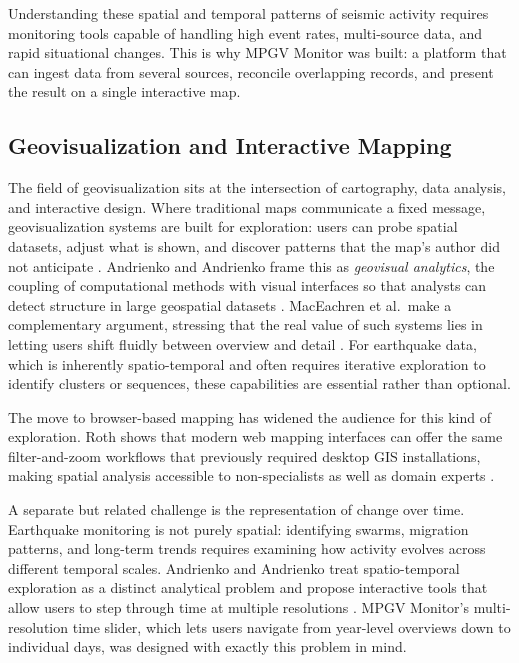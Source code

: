 \documentclass[12pt]{article}
\begin{document}
Understanding these spatial and temporal patterns of seismic activity requires monitoring tools capable of handling high event rates, multi-source data, and rapid situational changes. This is why MPGV Monitor was built: a platform that can ingest data from several sources, reconcile overlapping records, and present the result on a single interactive map.

\subsection{Geovisualization and Interactive Mapping}

The field of geovisualization sits at the intersection of cartography, data analysis, and interactive design. Where traditional maps communicate a fixed message, geovisualization systems are built for exploration: users can probe spatial datasets, adjust what is shown, and discover patterns that the map's author did not anticipate \cite{Andrienko2007Geovisual, MacEachren2004Geovisualization}. Andrienko and Andrienko frame this as \emph{geovisual analytics}, the coupling of computational methods with visual interfaces so that analysts can detect structure in large geospatial datasets \cite{Andrienko2007Geovisual}. MacEachren et al.\ make a complementary argument, stressing that the real value of such systems lies in letting users shift fluidly between overview and detail \cite{MacEachren2004Geovisualization}. For earthquake data, which is inherently spatio-temporal and often requires iterative exploration to identify clusters or sequences, these capabilities are essential rather than optional.

The move to browser-based mapping has widened the audience for this kind of exploration. Roth shows that modern web mapping interfaces can offer the same filter-and-zoom workflows that previously required desktop GIS installations, making spatial analysis accessible to non-specialists as well as domain experts \cite{Roth2013Interactive}.

A separate but related challenge is the representation of change over time. Earthquake monitoring is not purely spatial: identifying swarms, migration patterns, and long-term trends requires examining how activity evolves across different temporal scales. Andrienko and Andrienko treat spatio-temporal exploration as a distinct analytical problem and propose interactive tools that allow users to step through time at multiple resolutions \cite{Andrienko2007Visual}. MPGV Monitor's multi-resolution time slider, which lets users navigate from year-level overviews down to individual days, was designed with exactly this problem in mind.
\end{document}
